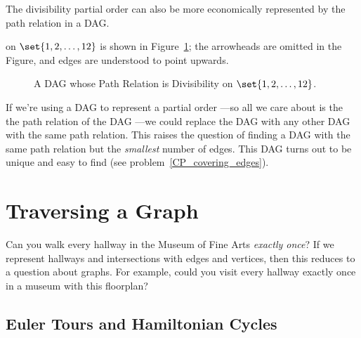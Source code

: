 The divisibility partial order can also be more economically represented by
the path relation in a DAG.   on $\set{1,2,\dots,12}$ is shown in
Figure~\ref{fig:divisibility-DAG}; the arrowheads are omitted in the
Figure, and edges are understood to point upwards.

\begin{figure}[h]
\begin{center}

\end{center}
\caption{A DAG whose Path Relation is Divisibility on $\set{1,2,\dots,12}$.}
\label{fig:divisibility-DAG}
\end{figure}

If we're using a DAG to represent a partial order ---so all we care
about is the the path relation of the DAG ---we could replace the DAG
with any other DAG with the same path relation.  This raises the
question of finding a DAG with the same path relation but the
\emph{smallest} number of edges.  This DAG turns out to be unique and
easy to find (see problem~\ref{CP_covering_edges}).

\begin{problems}
\practiceproblems
{}

\classproblems
{}

\homeworkproblems
{}
\end{problems}


\iffalse


\section{Traversing a Graph}
Can you walk every hallway in the Museum of Fine Arts {\em exactly
once}?  If we represent hallways and intersections with edges and
vertices, then this reduces to a question about graphs.  For example,
could you visit every hallway exactly once in a museum with this
floorplan?


\subsection{Euler Tours and Hamiltonian Cycles}

